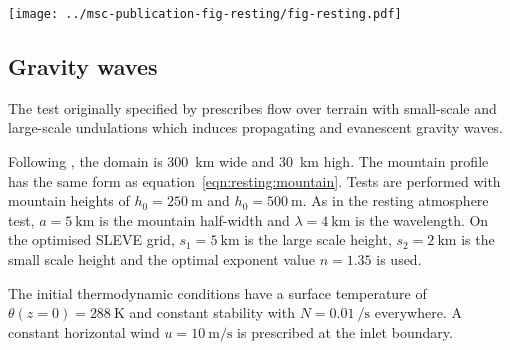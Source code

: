 \documentclass[twocol]{ametsoc}
\begin{document}
\begin{figure*}
	\centering
	\texttt{[image: ../msc-publication-fig-resting/fig-resting.pdf]}
%
	\caption{Maximum spurious vertical velocity, \(w\) (\si{\meter\per\second}), in the resting atmosphere test with results on (a) BTF, SLEVE, Hybrid Terrain Following (HTF) and Smoothed Terrain Following (STF) coordinates from \citet{klemp2011} using their improved horizontal pressure gradient formulation, (b) BTF, SLEVE, cut cell and regular grids using the model from \citet{weller-shahrokhi2014} which includes a curl-free pressure gradient formulation.  Note that vertical scales differ.}
	\label{fig:resting}
\end{figure*}

\subsection{Gravity waves}
The test originally specified by \citet{schaer2002} prescribes flow over terrain with small-scale and large-scale undulations which induces propagating and evanescent gravity waves.

Following \citet{melvin2010}, the domain is \SI{300}{\kilo\meter} wide and \SI{30}{\kilo\meter} high.  The mountain profile has the same form as equation~\ref{eqn:resting:mountain}.  Tests are performed with mountain heights of $h_0 = \SI{250}{\meter}$ and \(h_0 = \SI{500}{\meter}\).  As in the resting atmosphere test, $a = \SI{5}{\kilo\meter}$ is the mountain half-width and $\lambda = \SI{4}{\kilo\meter}$ is the wavelength.  On the optimised SLEVE grid, $s_1 = \SI{5}{\kilo\meter}$ is the large scale height, $s_2 = \SI{2}{\kilo\meter}$ is the small scale height and the optimal exponent value $n = 1.35$ is used.

The initial thermodynamic conditions have a surface temperature of $\theta(z=0) = \SI{288}{\kelvin}$ and constant stability with $N = \SI{0.01}{\per\second}$ everywhere.  A constant horizontal wind $u = \SI{10}{\meter\per\second}$ is prescribed at the inlet boundary.
\end{document}
